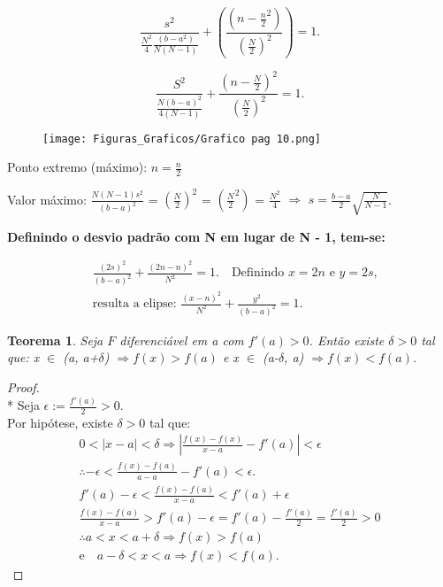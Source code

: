 \documentclass{article}
\newtheorem*{theorem}{Teorema}
\begin{document}
\[
\frac{s^2}{\frac{N^2}{4}\frac{(b-a^2)}{N(N-1)}} + (\frac{(n-\frac{n}{2}^2)}{(\frac{N}{2})^2}) = 1.
\]

\[
\frac{S^2}{\frac{N(b-a)^2}{4(N-1)}} + \frac{(n-\frac{N}{2})^2}{(\frac{N}{2})^2} = 1.
\]

\begin{figure}[H]
    \centering
    \texttt{[image: Figuras\_Graficos/Grafico pag 10.png]}
\end{figure}

Ponto extremo (máximo): $n=\frac{n}{2}$

Valor máximo: $\frac{N(N-1)s^2}{(b-a)^2}$ = $(\frac{N}{2})^2$ = $(\frac{N}{2}^2)$ = $\frac{N^2}{4}$ $\Rightarrow{}$ $s = \frac{b-a}{2}\sqrt{\frac{N}{N-1}}$.


\textbf{Definindo o desvio padrão com N em lugar de N - 1, tem-se:}

\begin{align*}
    &\frac{(2s)^2}{(b-a)^2} + \frac{(2n - n)^2}{N^2} = 1. \quad \text{Definindo $x = 2n$ e $y = 2s$,} \\
    &\text{resulta a elipse: $\frac{(x-n)^2}{N^2} + \frac{y^2}{(b-a)^2} = 1$.}  
\end{align*}


\pagebreak

\begin{theorem}
    Seja $F$ diferenciável em a com $f'(a)>0$. Então existe $\delta > 0$ tal que: x $\in$ (a, a+$\delta$) $\Rightarrow{} f(x)>f(a)$ e \quad x $\in$ (a-$\delta$, a) $\Rightarrow{} f(x)<f(a)$.
\end{theorem} 

\begin{proof}\mbox{}\\*
    Seja $\epsilon:= \frac{f'(a)}{2}>0$. \\
    Por hipótese, existe $\delta>0$ tal que:
\begin{align*} 
    0 < |x - a| < \delta \Rightarrow |\frac{f(x) - f(x)}{x-a} - f'(a)| < \epsilon \\
    \therefore -\epsilon < \frac{f(x) - f(a)}{a - a} - f'(a) < \epsilon. \\
    f'(a) - \epsilon < \frac{f(x) - f(a)}{x - a} < f'(a) + \epsilon \\
    \frac{f(x) - f(a)}{x - a} > f'(a) - \epsilon = f'(a) -\frac{f'(a)}{2} = \frac{f'(a)}{2} > 0 \\
    \therefore a<x<a+\delta \Rightarrow f(x) > f(a) \\
    \text{e} \quad a - \delta < x < a \Rightarrow f(x) < f(a).
\end{align*}
\end{proof}
\end{document}
